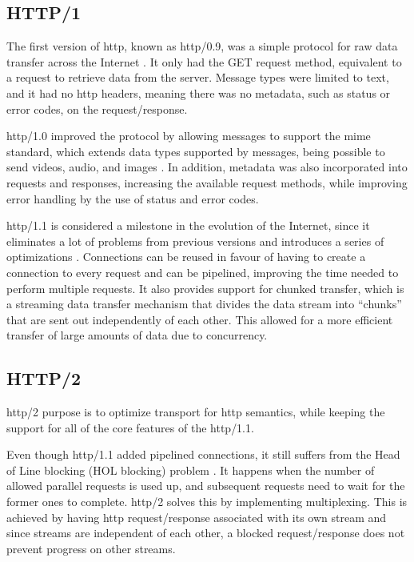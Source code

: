 \subsection{HTTP/1}

The first version of \gls{http}, known as \gls{http}/0.9, was a simple protocol for raw data transfer across the Internet \cite{rfc2616}. It only had the GET request method, equivalent to a request to retrieve data from the server. Message types were limited to text, and it had no \gls{http} headers, meaning there was no metadata, such as status or error codes, on the request/response.

\gls{http}/1.0 improved the protocol by allowing messages to support the \gls{mime} standard, which extends data types supported by messages, being possible to send videos, audio, and images \cite{rfc2616}. In addition, metadata was also incorporated into requests and responses, increasing the available request methods, while improving error handling by the use of status and error codes.

\gls{http}/1.1 is considered a milestone in the evolution of the Internet, since it eliminates a lot of problems from previous versions and introduces a series of optimizations \cite{what_is_http}. Connections can be reused in favour of having to create a connection to every request and can be pipelined, improving the time needed to perform multiple requests. It also provides support for chunked transfer, which is a streaming data transfer mechanism that divides the data stream into “chunks” that are sent out independently of each other. This allowed for a more efficient transfer of large amounts of data due to concurrency.

\subsection{HTTP/2}

\gls{http}/2 purpose is to optimize transport for \gls{http} semantics, while keeping the support for all of the core features of the \gls{http}/1.1.

Even though \gls{http}/1.1 added pipelined connections, it still suffers from the Head of Line blocking (HOL blocking) problem \cite{rfc7540}. It happens when the number of allowed parallel requests is used up, and subsequent requests need to wait for the former ones to complete. \gls{http}/2 solves this by implementing multiplexing. This is achieved by having \gls{http} request/response associated with its own stream and since streams are independent of each other, a blocked request/response does not prevent progress on other streams.

